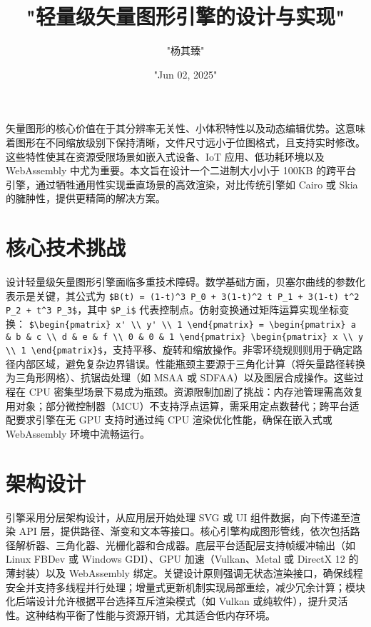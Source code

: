 \title{"轻量级矢量图形引擎的设计与实现"}
\author{"杨其臻"}
\date{"Jun 02, 2025"}
\maketitle
矢量图形的核心价值在于其分辨率无关性、小体积特性以及动态编辑优势。这意味着图形在不同缩放级别下保持清晰，文件尺寸远小于位图格式，且支持实时修改。这些特性使其在资源受限场景如嵌入式设备、IoT 应用、低功耗环境以及 WebAssembly 中尤为重要。本文旨在设计一个二进制大小小于 100KB 的跨平台引擎，通过牺牲通用性实现垂直场景的高效渲染，对比传统引擎如 Cairo 或 Skia 的臃肿性，提供更精简的解决方案。\par
\chapter{核心技术挑战}
设计轻量级矢量图形引擎面临多重技术障碍。数学基础方面，贝塞尔曲线的参数化表示是关键，其公式为 \verb!$B(t) = (1-t)^3 P_0 + 3(1-t)^2 t P_1 + 3(1-t) t^2 P_2 + t^3 P_3$!，其中 \verb!$P_i$! 代表控制点。仿射变换通过矩阵运算实现坐标变换： \verb!$\begin{pmatrix} x' \\ y' \\ 1 \end{pmatrix} = \begin{pmatrix} a & b & c \\ d & e & f \\ 0 & 0 & 1 \end{pmatrix} \begin{pmatrix} x \\ y \\ 1 \end{pmatrix}$!，支持平移、旋转和缩放操作。非零环绕规则则用于确定路径内部区域，避免复杂边界错误。性能瓶颈主要源于三角化计算（将矢量路径转换为三角形网格）、抗锯齿处理（如 MSAA 或 SDFAA）以及图层合成操作。这些过程在 CPU 密集型场景下易成为瓶颈。资源限制加剧了挑战：内存池管理需高效复用对象；部分微控制器（MCU）不支持浮点运算，需采用定点数替代；跨平台适配要求引擎在无 GPU 支持时通过纯 CPU 渲染优化性能，确保在嵌入式或 WebAssembly 环境中流畅运行。\par
\chapter{架构设计}
引擎采用分层架构设计，从应用层开始处理 SVG 或 UI 组件数据，向下传递至渲染 API 层，提供路径、渐变和文本等接口。核心引擎构成图形管线，依次包括路径解析器、三角化器、光栅化器和合成器。底层平台适配层支持帧缓冲输出（如 Linux FBDev 或 Windows GDI）、GPU 加速（Vulkan、Metal 或 DirectX 12 的薄封装）以及 WebAssembly 绑定。关键设计原则强调无状态渲染接口，确保线程安全并支持多线程并行处理；增量式更新机制实现局部重绘，减少冗余计算；模块化后端设计允许根据平台选择互斥渲染模式（如 Vulkan 或纯软件），提升灵活性。这种结构平衡了性能与资源开销，尤其适合低内存环境。\par
